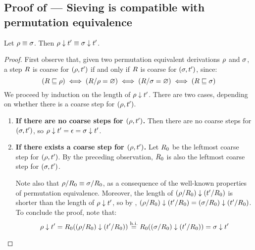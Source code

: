 \subsection*{Proof of  --- Sieving is compatible with permutation equivalence}
\label{sieving_is_compatible_with_permutation_equivalence_proof}
Let $\rho \equiv \sigma$. Then $\rho \downarrow t' \equiv \sigma \downarrow t'$.
\begin{proof}
First observe that, given two permutation equivalent derivations $\rho$ and $\sigma$,
a step $R$ is coarse for $(\rho,t')$ if and only if $R$ is coarse for $(\sigma,t')$,
since:
\[
  (R \sqsubseteq \rho) \iff (R/\rho = \varnothing) \iff (R/\sigma = \varnothing) \iff (R \sqsubseteq \sigma)
\]
We proceed by induction on the length of $\rho \downarrow t'$.
There are two cases, depending on whether there is a coarse step for $(\rho,t')$.
\begin{enumerate}
\item {\bf If there are no coarse steps for $(\rho,t')$.}
  Then there are no coarse steps for $(\sigma,t')$,
  so $\rho \downarrow t' = \epsilon = \sigma \downarrow t'$.
\item {\bf If there exists a coarse step for $(\rho,t')$.}
  Let $R_0$ be the leftmost coarse step for $(\rho,t')$.
  By the preceding observation, $R_0$ is also the leftmost coarse step for $(\sigma,t')$.

  Note also that $\rho/R_0 \equiv \sigma/R_0$,
  as a consequence of the well-known properties of permutation equivalence.
  Moreover, the length of $(\rho/R_0) \downarrow (t'/R_0)$ is
  shorter than the length of $\rho \downarrow t'$,
  so by \ih, $(\rho/R_0) \downarrow (t'/R_0) = (\sigma/R_0) \downarrow (t'/R_0)$.
  To conclude the proof, note that:
  \[
    \rho \downarrow t' = R_0 ((\rho/R_0) \downarrow (t'/R_0))
    \overset{\mathrm{h.i.}}{=} R_0 ((\sigma/R_0) \downarrow (t'/R_0)) = \sigma \downarrow t'
  \]
\end{enumerate}
\end{proof}


